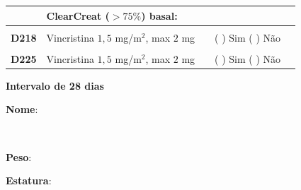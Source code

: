 \documentclass[11pt,a4paper,oldfontcommands]{memoir}
\def\entrywithlabel[#1]#2{\parbox{#1}{{\small #2:} \hrulefill}}
\begin{document}
\begin{center}
\begin{table}[H]
\begin{tabular}{p{1cm}p{6cm}|p{1cm}|p{3cm}|p{2.5cm}}
    \cline{2-5}
    \multicolumn{1}{c|}{\multirow{2}{*}{{}}}&\multicolumn{2}{l|}{ClearCreat (\(>75\%\)) basal:}&{}&{}\\
    \hline
    \\
    \hline
    \multicolumn{1}{c|}{\multirow{1}{*}{\textbf{D218}}}&{Vincristina \(1,5\) mg/m\(^2\), max \(2\) mg}&&{(  ) Sim (  ) Não}&\\
    \hline
    \\
    \hline
    \multicolumn{1}{c|}{\multirow{1}{*}{\textbf{D225}}}&{Vincristina \(1,5\) mg/m\(^2\), max \(2\) mg}&&{(  ) Sim (  ) Não}&\\
    \hline
    \end{tabular}
    \end{table}
    \textbf{Intervalo de 28 dias}

    \clearpage
    \noindent
\entrywithlabel[1\hsize]{\textbf{Nome}}\hfill
\\[0.3cm]
\entrywithlabel[.45\hsize]{\textbf{Peso}}\hfill  \entrywithlabel[.45\hsize]{\textbf{Estatura}}


\end{center}
\end{document}
